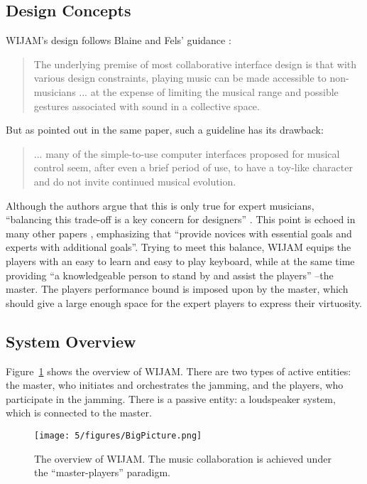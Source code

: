 \subsection{Design Concepts}
\noindent
WIJAM's design follows Blaine and Fels' guidance \cite{Blaine2003}:
\begin{quote}
The underlying premise of most collaborative interface design is that with various design constraints, playing music can be made accessible to non-musicians ... at the expense of limiting the musical range and possible gestures associated with sound in a collective space.
\end{quote}
But as pointed out in the same paper, such a guideline has its drawback:
\begin{quote}
... many of the simple-to-use computer interfaces proposed for musical control seem, after even a brief period of use, to have a toy-like
character and do not invite continued musical evolution.
\end{quote}
Although the authors argue that this is only true for expert musicians, ``balancing this trade-off is a key concern for designers'' \cite{blaine2003collaborative}. This point is echoed in many other papers \cite{xambo2011multi}, emphasizing that ``provide novices with essential goals and experts with additional goals''. Trying to meet this balance, WIJAM equips the players with an easy to learn and easy to play keyboard, while at the same time providing ``a knowledgeable person to stand by and assist the players'' \cite{Blaine2003}--the master. The players performance bound is imposed upon by the master, which should give a large enough space for the expert players to express their virtuosity.

\subsection{System Overview}
Figure~\ref{fig:5-BigPicture} shows the overview of WIJAM. There are two types of active entities: the master, who initiates and orchestrates the jamming, and the players, who participate in the jamming. There is a passive entity: a loudspeaker system, which is connected to the master.

\begin{figure}[htbp]
    \centering
        \texttt{[image: 5/figures/BigPicture.png]}
    \caption{The overview of WIJAM. The music collaboration is achieved under the ``master-players'' paradigm.}
    \label{fig:5-BigPicture}
\end{figure}

